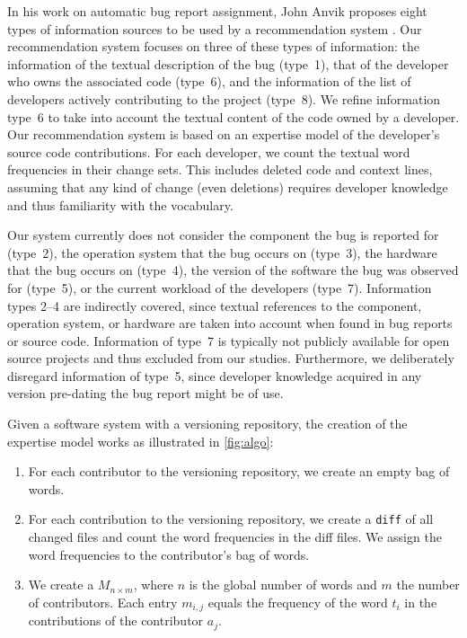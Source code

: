 In his work on automatic bug report assignment, John Anvik proposes eight types of information sources to be used by a recommendation system \cite{Anvi06b}. Our recommendation system focuses on three of these types of information: the information of the textual description of the bug (type~1), that of the developer who owns the associated code (type~6), and the information of the list of developers actively contributing to the project (type~8). We refine information type~6 to take into account the textual content of the code owned by a developer. Our recommendation system is based on an expertise model of the developer's source code contributions. For each developer, we count the textual word frequencies in their change sets. This includes deleted code and context lines, assuming that any kind of change (even deletions) requires developer knowledge and thus familiarity with the vocabulary. 

Our system currently does not consider the component the bug is reported for (type~2), the operation system that the bug occurs on (type~3), the hardware that the bug occurs on (type~4), the version of the software the bug was observed for (type~5), or the current workload of the developers (type~7). Information types 2--4 are indirectly covered, since textual references to the component, operation system, or hardware are taken into account when found in bug reports or source code. Information of type~7 is typically not publicly available for open source projects and thus excluded from our studies. Furthermore, we deliberately disregard information of type~5, since developer knowledge acquired in any version pre-dating the bug report might be of use. 

Given a software system with a versioning repository, the creation of the expertise model works as illustrated in \autoref{fig:algo}:

\begin{enumerate}
\item For each contributor to the versioning repository, we create an empty bag of words. 
\item For each contribution to the versioning repository, we create a \verb$diff$ of all changed files and count the word frequencies in the diff files. We assign the word frequencies to the contributor's bag of words.
\item We create a \TAM $M_{n \times m}$, where $n$ is the global number of words and $m$ the number of contributors. Each entry $m_{i,j}$ equals the frequency of the word $t_i$ in the contributions of the contributor $a_j$. 
\end{enumerate}

